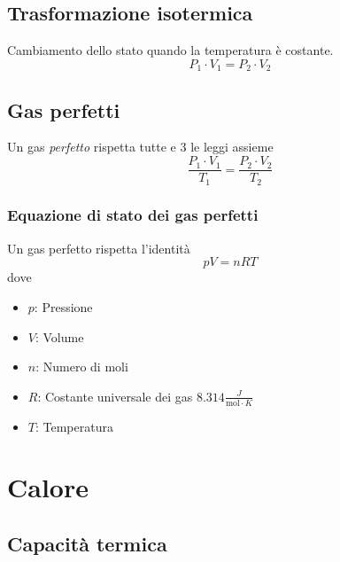 \documentclass[a4paper]{article}
\begin{document}
\subsection{Trasformazione isotermica}

\begin{minipage}[left]{0.25\textwidth}
\end{minipage}
\begin{minipage}[left]{0.75\textwidth}
Cambiamento dello stato quando la temperatura è costante.
\[
    P_1 \cdot V_1 = P_2 \cdot V_2
\]
\end{minipage}

\subsection{Gas perfetti}

Un gas \textit{perfetto} rispetta tutte e 3 le leggi assieme
\[
    \frac{P_1 \cdot V_1}{T_1} = \frac{P_2 \cdot V_2}{T_2}
\]

\subsubsection{Equazione di stato dei gas perfetti}

Un gas perfetto rispetta l'identità
\[
    pV = nRT
\]
dove
\begin{itemize}
    \item \(p\): Pressione
    \item \(V\): Volume
    \item \(n\): Numero di moli
    \item \(R\): Costante universale dei gas \(8.314 \frac{J}{\text{mol} \cdot K}\)
    \item \(T\): Temperatura
\end{itemize}

\pagebreak

\section{Calore}

\subsection{Capacità termica}
\end{document}
